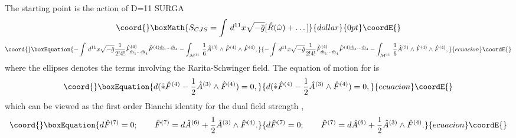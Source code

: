 \documentclass[a4paper,11pt]{article}
\begin{document}
The starting point is the action of D=11 SURGA \cite{CJS}
$$\coord{}\boxMath{
S_{CJS}=\int \, d^{11}x \sqrt{-{\hat g}} [{\hat R}({\hat
\omega})+\dots ]
}{dollar}{0pt}\coordE{}$$
\begin{equation}\coord{}\boxEquation{\plabel{cjs}
-\int
\, d^{11}x \sqrt{-{\hat g}}{1\over 2!4!}{\hat
F}^{(4)}_{\underline{\hat m}_1\dots
\underline{\hat m}_4}{\hat F}^{(4)\underline{\hat m}_1\dots
\underline{\hat m}_4}
-\int_{{\cal M}^{11}} \, {1\over 6}
{\hat A}^{(3)}\wedge {\hat F}^{(4)}\wedge {\hat F}^{(4)},
}{-\int
\, d^{11}x \sqrt{-{\hat g}}{1\over 2!4!}{\hat
F}^{(4)}_{\underline{\hat m}_1\dots
\underline{\hat m}_4}{\hat F}^{(4)\underline{\hat m}_1\dots
\underline{\hat m}_4}
-\int_{{\cal M}^{11}} \, {1\over 6}
{\hat A}^{(3)}\wedge {\hat F}^{(4)}\wedge {\hat F}^{(4)},
}{ecuacion}\coordE{}\end{equation}
where the ellipses denotes the terms involving the Rarita-Schwinger field.
The equation of motion for \coordHE{} is
\begin{equation}\coord{}\boxEquation{\plabel{emA3}
d(\hat{\ast}{\hat F}^{(4)}-{1\over 2}{\hat A}^{(3)}\wedge {\hat
F}^{(4)})=0,
}{d(\hat{\ast}{\hat F}^{(4)}-{1\over 2}{\hat A}^{(3)}\wedge {\hat
F}^{(4)})=0,
}{ecuacion}\coordE{}\end{equation}
which can be viewed as the first order Bianchi identity for the dual field strength \cite{bbs},
\cite{cjlp}
\begin{equation}\coord{}\boxEquation{\plabel{BI}
d{\hat F}^{(7)}=0;\qquad {\hat F}^{(7)}=d{\hat A}^{(6)}+{1\over 2}{\hat A}^{(3)}\wedge
{\hat F}^{(4)}.
}{d{\hat F}^{(7)}=0;\qquad {\hat F}^{(7)}=d{\hat A}^{(6)}+{1\over 2}{\hat A}^{(3)}\wedge
{\hat F}^{(4)}.
}{ecuacion}\coordE{}\end{equation}
\end{document}
